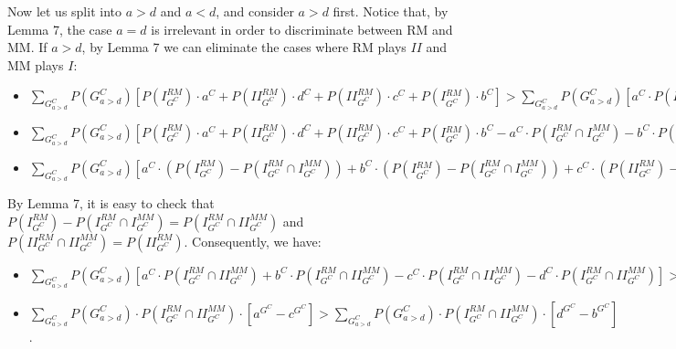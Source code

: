 \documentclass[fleqn,reqno,11pt]{article}
\begin{document}
Now let us split into $a>d$ and $a<d$, and consider $a>d$ first.
Notice that, by Lemma 7, the case $a=d$ is irrelevant in order to
discriminate between RM and MM. If $a>d$, by Lemma 7 we can eliminate
the cases where RM plays $II$ and MM plays $I$:
\begin{itemize}
\item $\sum_{G_{a>d}^{C}}P(G_{a>d}^{C})[P(I_{G^{C}}^{RM})\cdot a^{C}+P(II_{G^{C}}^{RM})\cdot d^{C}+P(II_{G^{C}}^{RM})\cdot c^{C}+P(I{}_{G^{C}}^{RM})\cdot b^{C}]>\sum_{G_{a>d}^{C}}P(G_{a>d}^{C})[a^{C}\cdot P(I_{G^{C}}^{RM}\cap I_{G^{C}}^{MM})+b^{C}\cdot P(I_{G^{C}}^{RM}\cap I_{G^{C}}^{MM})+c^{C}\cdot(P(I_{G^{C}}^{RM}\cap II_{G^{C}}^{MM})+P(II_{G^{C}}^{RM}\cap II_{G^{C}}^{MM}))+d^{C}\cdot(P(II_{G^{C}}^{RM}\cap II_{G^{C}}^{MM})+P(I_{G^{C}}^{RM}\cap II_{G^{C}}^{MM}))]$
\item $\sum_{G_{a>d}^{C}}P(G_{a>d}^{C})[P(I_{G^{C}}^{RM})\cdot a^{C}+P(II_{G^{C}}^{RM})\cdot d^{C}+P(II_{G^{C}}^{RM})\cdot c^{C}+P(I{}_{G^{C}}^{RM})\cdot b^{C}-a^{C}\cdot P(I_{G^{C}}^{RM}\cap I_{G^{C}}^{MM})-b^{C}\cdot P(I_{G^{C}}^{RM}\cap I_{G^{C}}^{MM})-c^{C}\cdot(P(I_{G^{C}}^{RM}\cap II_{G^{C}}^{MM})+P(II_{G^{C}}^{RM}\cap II_{G^{C}}^{MM}))-d^{C}\cdot(P(II_{G^{C}}^{RM}\cap II_{G^{C}}^{MM})+P(I_{G^{C}}^{RM}\cap II_{G^{C}}^{MM}))]>0$
\item $\sum_{G_{a>d}^{C}}P(G_{a>d}^{C})[a^{C}\cdot(P(I_{G^{C}}^{RM})-P(I_{G^{C}}^{RM}\cap I_{G^{C}}^{MM}))+b^{C}\cdot(P(I{}_{G^{C}}^{RM})-P(I_{G^{C}}^{RM}\cap I_{G^{C}}^{MM}))+c^{C}\cdot(P(II_{G^{C}}^{RM})-P(I_{G^{C}}^{RM}\cap II_{G^{C}}^{MM})-P(II_{G^{C}}^{RM}\cap II_{G^{C}}^{MM}))+d^{C}\cdot(P(II_{G^{C}}^{RM})-P(II_{G^{C}}^{RM}\cap II_{G^{C}}^{MM})-P(I_{G^{C}}^{RM}\cap II_{G^{C}}^{MM}))]>0$
\end{itemize}
By Lemma 7, it is easy to check that $P(I_{G^{C}}^{RM})-P(I_{G^{C}}^{RM}\cap I_{G^{C}}^{MM})=P(I_{G^{C}}^{RM}\cap II_{G^{C}}^{MM})$
and $P(II_{G^{C}}^{RM}\cap II_{G^{C}}^{MM})=P(II_{G^{C}}^{RM})$.
Consequently, we have:
\begin{itemize}
\item $\sum_{G_{a>d}^{C}}P(G_{a>d}^{C})[a^{C}\cdot P(I_{G^{C}}^{RM}\cap II_{G^{C}}^{MM})+b^{C}\cdot P(I_{G^{C}}^{RM}\cap II_{G^{C}}^{MM})-c^{C}\cdot P(I_{G^{C}}^{RM}\cap II_{G^{C}}^{MM})-d^{C}\cdot P(I_{G^{C}}^{RM}\cap II_{G^{C}}^{MM})]>0$
\item $\sum_{G_{a>d}^{C}}P(G_{a>d}^{C})\cdot P(I_{G^{C}}^{RM}\cap II_{G^{C}}^{MM})\cdot[a^{G^{C}}-c^{G^{C}}]>\sum_{G_{a>d}^{C}}P(G_{a>d}^{C})\cdot P(I_{G^{C}}^{RM}\cap II_{G^{C}}^{MM})\cdot[d^{G^{C}}-b^{G^{C}}]$.
\end{itemize}
\medskip{}
\end{document}
